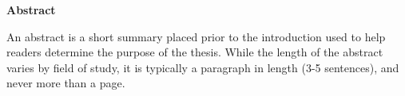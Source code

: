 \clearpage
\null
\vfil
\thispagestyle{plain}
\begin{center}\textbf{Abstract}\end{center}
An abstract is a short summary placed prior to the introduction used to help
readers determine the purpose of the thesis. While the length of the abstract
varies by field of study, it is typically a paragraph in length (3-5 sentences),
and never more than a page.
\vfil
\clearpage 
